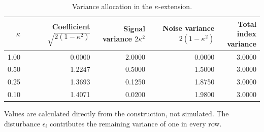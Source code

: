 \begin{table}[!tb]
\caption{Variance allocation in the $\kappa$-extension.}
\label{tab:kappa-illustration}
\centering
\begin{tabular}{rrrrr}
\toprule
$\kappa$ & \shortstack{Coefficient\\$\sqrt{2(1-\kappa^2)}$} & \shortstack{Signal variance\\$2\kappa^2$} & \shortstack{Noise variance\\$2(1-\kappa^2)$} & \shortstack{Total index\\variance} \\
\midrule
1.00 & 0.0000 & 2.0000 & 0.0000 & 3.0000 \\
0.50 & 1.2247 & 0.5000 & 1.5000 & 3.0000 \\
0.25 & 1.3693 & 0.1250 & 1.8750 & 3.0000 \\
0.10 & 1.4071 & 0.0200 & 1.9800 & 3.0000 \\
\bottomrule
\end{tabular}
\begin{tablenotes}
Values are calculated directly from the construction, not simulated. The disturbance $\epsilon_i$ contributes the remaining variance of one in every row.
\end{tablenotes}
\end{table}
